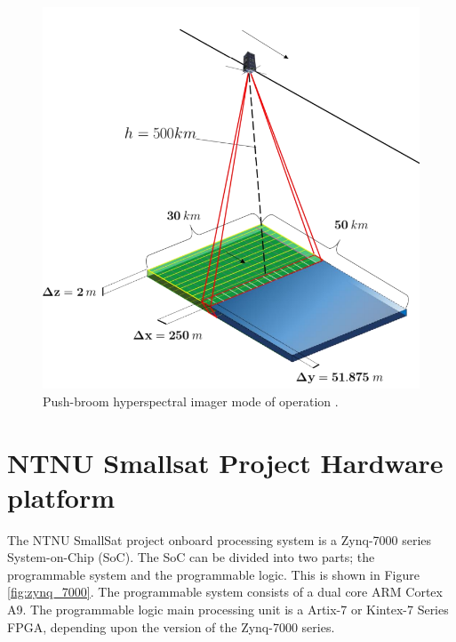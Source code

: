 \begin{figure}[H]
\centering
   \includegraphics[scale=0.36]{images/hyperspectral_imager.PNG}
  \caption{ Push-broom hyperspectral imager mode of operation \cite{SmallSat_project_description}.  } 
  \label{fig:HSI_functionality}
\end{figure}

\section{NTNU Smallsat Project Hardware platform}
The NTNU SmallSat project onboard processing system is a Zynq-7000 series System-on-Chip (SoC). The SoC can be divided into two parts; the programmable system and the programmable logic. This is shown in Figure \ref{fig:zynq_7000}. The programmable system consists of a dual core ARM Cortex A9. The programmable logic main processing unit is a Artix-7 or Kintex-7 Series FPGA, depending upon the version of the Zynq-7000 series.


